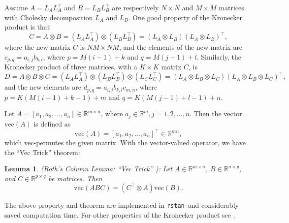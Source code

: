 \documentclass[a4paper]{article}   	%
\newtheorem{lemma}[theorem]{Lemma}
\newcommand{\rstan}{\texttt{rstan}}
\begin{document}
	Assume $A=L_A L_A^\top$ and $B=L_B L_B^\top$ are respectively $N\times N$ and $M\times M$ matrices with Cholesky decomposition $L_A$ and $L_B$. One good property of the Kronecker product is that
	\begin{equation}
		C=A\otimes B = (L_A L_A^\top)\otimes (L_B L_B^\top) = (L_A\otimes L_B)(L_A \otimes L_B)^\top,
	\end{equation}
	where the new matrix $C$ is $NM\times NM$, and the elements of the new matrix are  $c_{p,q}=a_{i,j}b_{k,l}$, where $p=M(i-1)+k$ and $q=M(j-1)+l$. Similarly, the Kronecker product of three matrices, with a $K\times K$ matrix $C$, is
	\begin{equation}
		D=A\otimes B\otimes C = (L_A L_A^\top)\otimes (L_B L_B^\top)\otimes (L_C L_C^\top) = (L_A\otimes L_B\otimes L_C) (L_A\otimes  L_B\otimes L_C)^\top,
	\end{equation}
	and the new elements are $d_{p,q}=a_{i,j}b_{k,l}c_{m,n}$, where $p=K(M(i-1)+k-1)+m$ and $q=K(M(j-1)+l-1)+n$. 
	
	
	Let $A=[a_1,a_2,\ldots,a_n]\in \mathbb{R}^{m\times n}$, where $a_j\in\mathbb{R}^m, j=1,2,\ldots,n$. Then the vector $\mbox{vec}(A)$ is defined as 
	\begin{equation}
		\mbox{vec}(A) = [a_1,a_2,\ldots,a_n]^\top \in \mathbb{R}^{mn}, 
	\end{equation}
	which vec-permutes the given matrix. With the vector-valued operator, we have the ``Vec Trick'' theorem: 	
	\begin{lemma} (Roth's Column Lemma: ``Vec Trick'' \parencite{Roth1934Direct, Airola2018Fast} ): Let $A \in \mathbb{R}^{m\times n}$, $B \in \mathbb{R}^{n\times p}$, and $C \in \mathbb{R}^{p\times q}$ be matrices. Then
			\begin{equation}
			 \mbox{vec}(ABC) =	(C^\top \otimes A)\mbox{vec}(B). 
			\end{equation}
	\end{lemma}
	
	The above property and theorem are implemented in \rstan\ and considerably saved computation time. For other properties of the Kronecker product see \textcite{Zhang2013Kronecker}.
	
	
	\renewcommand\bibname{References}%
	\printbibliography
\end{document}
